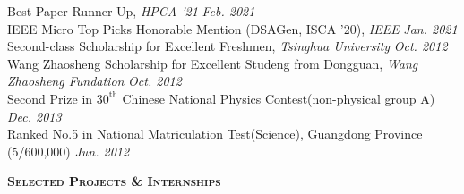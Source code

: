 \documentclass[a4paper]{article}
\newenvironment{changemargin}[2]{%
  \begin{list}{}{%
    \setlength{\topsep}{0pt}%
    \setlength{\leftmargin}{#1}%
    \setlength{\rightmargin}{#2}%
    \setlength{\listparindent}{\parindent}%
    \setlength{\itemindent}{\parindent}%
    \setlength{\parsep}{\parskip}%
  }%
  \item[]}{\end{list}
}
\newcommand{\lineover}{
	\begin{changemargin}{-0.05in}{-0.05in}
		\vspace*{-8pt}
		\hrulefill \\
		\vspace*{-2pt}
	\end{changemargin}
}
\newcommand{\header}[1]{
	\begin{changemargin}{-0.5in}{-0.5in}
		\scshape{\textbf{#1}}\\
  	\lineover
	\end{changemargin}
}
\newenvironment{body} {
	\vspace*{-16pt}
	\begin{changemargin}{-0.25in}{-0.5in}
  }	
	{\end{changemargin}
}
\begin{document}
\begin{body}
	\vspace{14pt}
	Best Paper Runner-Up, \emph{HPCA '21} \hfill{} \emph{Feb. 2021}\\
	\smallskip
	IEEE Micro Top Picks Honorable Mention (DSAGen, ISCA '20), \emph{IEEE} \hfill{} \emph{Jan. 2021}\\
	\smallskip
	Second-class Scholarship for Excellent Freshmen, \emph{Tsinghua University} \hfill{} \emph{Oct. 2012}\\
	\smallskip
	Wang Zhaosheng Scholarship for Excellent Studeng from Dongguan, \emph{Wang Zhaosheng Fundation} \hfill{} \emph{Oct. 2012}\\
	\smallskip
	Second Prize in $30^{\mathrm{th}}$ Chinese National Physics Contest(non-physical group A) \hfill{} \emph{Dec. 2013}\\
	\smallskip
	Ranked No.5 in National Matriculation Test(Science), Guangdong Province (5/600,000) \hfill{} \emph{Jun. 2012}
\end{body}

\smallskip
\smallskip

\header{Selected Projects \& Internships}
\end{document}
